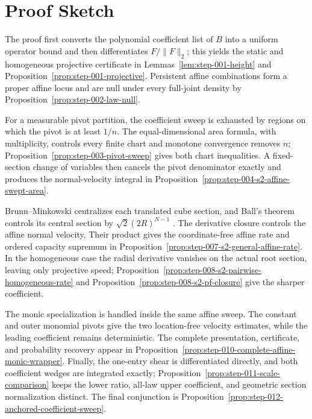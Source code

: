 \section{Proof Sketch}\label{sec:proof-sketch}

The proof first converts the polynomial coefficient list of $B$ into a uniform operator bound and then
differentiates $F/\|F\|_2$; this yields the static and homogeneous projective certificate in
Lemmas~\ref{lem:step-001-height} and Proposition~\ref{prop:step-001-projective}. Persistent affine
combinations form a proper affine locus and are null under every full-joint density by
Proposition~\ref{prop:step-002-law-null}.

For a measurable pivot partition, the coefficient sweep is exhausted by regions on which the pivot is at
least $1/n$. The equal-dimensional area formula, with multiplicity, controls every finite chart and monotone
convergence removes $n$; Proposition~\ref{prop:step-003-pivot-sweep} gives both chart inequalities. A
fixed-section change of variables then cancels the pivot denominator exactly and produces the normal-velocity
integral in Proposition~\ref{prop:step-004-s2-affine-swept-area}.

Brunn--Minkowski centralizes each translated cube section, and Ball's theorem controls its central section by
$\sqrt2(2R)^{N-1}$ \citep{ball1986cube}. The derivative closure controls the affine normal velocity. Their
product gives the coordinate-free affine rate and ordered capacity supremum in
Proposition~\ref{prop:step-007-s2-general-affine-rate}. In the homogeneous case the radial derivative vanishes
on the actual root section, leaving only projective speed; Proposition~\ref{prop:step-008-s2-pairwise-homogeneous-rate}
and Proposition~\ref{prop:step-008-s2-pf-closure} give the sharper coefficient.

The monic specialization is handled inside the same affine sweep. The constant and outer monomial pivots give
the two location-free velocity estimates, while the leading coefficient remains deterministic. The complete
presentation, certificate, and probability recovery appear in
Proposition~\ref{prop:step-010-complete-affine-monic-wrapper}. Finally, the one-entry shear is differentiated
directly, and both coefficient wedges are integrated exactly; Proposition~\ref{prop:step-011-scale-comparison}
keeps the lower ratio, all-law upper coefficient, and geometric section normalization distinct. The final
conjunction is Proposition~\ref{prop:step-012-anchored-coefficient-sweep}.
